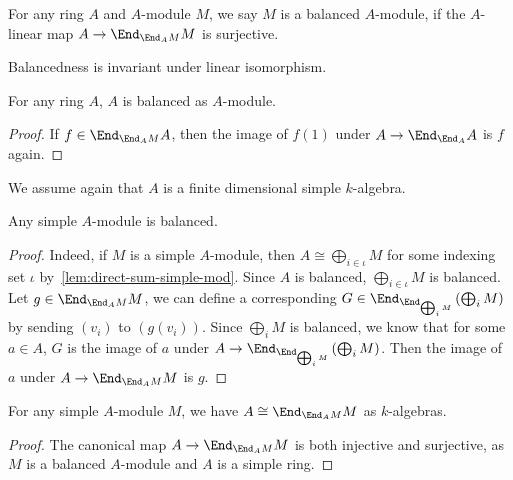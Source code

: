 \begin{definition}\label{def:balanced-mod}
  \leanok
  For any ring $A$ and $A$-module $M$, we say $M$ is a
  balanced $A$-module, if the $A$-linear map $A \to \End_{\End_{A}M}M$ is
  surjective.
\end{definition}

\begin{remark}
  Balancedness is invariant under linear isomorphism.
\end{remark}

\begin{lemma}\label{lem:balanced-self}
  For any ring $A$, $A$ is balanced as $A$-module. \leanok
\end{lemma}
\begin{proof}
  If $f \in \End_{\End_{A}M}A$, then the image of $f(1)$ under
  $A \to\End_{\End_{A}}A$ is $f$ again.
\end{proof}

We assume again that $A$ is a finite dimensional simple $k$-algebra.
\begin{lemma}
  Any simple $A$-module is balanced.
  \leanok
\end{lemma}
\begin{proof}
  Indeed, if $M$ is a simple $A$-module, then $A \cong \bigoplus_{i\in\iota} M$
  for some indexing set $\iota$ by~\cref{lem:direct-sum-simple-mod}. Since $A$
  is balanced, $\bigoplus_{i\in\iota}M$ is balanced. Let
  $g \in \End_{\End_{A}M}M$, we can define a corresponding
  $G \in \End_{\End_{\bigoplus_{i}M}}\left(\bigoplus_{i}M\right)$ by sending
  $(v_{i})$ to $(g(v_{i}))$. Since $\bigoplus_{i}M$ is balanced, we know that
  for some $a\in A$, $G$ is the image of $a$ under
  $A \to \End_{\End_{\bigoplus_{i}M}}\left(\bigoplus_{i}M\right)$. Then the
  image of $a$ under $A \to \End_{\End_{A}M}M$ is $g$.
\end{proof}

\begin{lemma}\label{lem:iso-end-end}
  For any simple $A$-module $M$, we have $A \cong \End_{\End_{A}M}M$ as
  $k$-algebras.
\end{lemma}
\begin{proof}
  The canonical map $A \to \End_{\End_{A}M}M$ is both injective and surjective,
  as $M$ is a balanced $A$-module and $A$ is a simple ring.
\end{proof}



